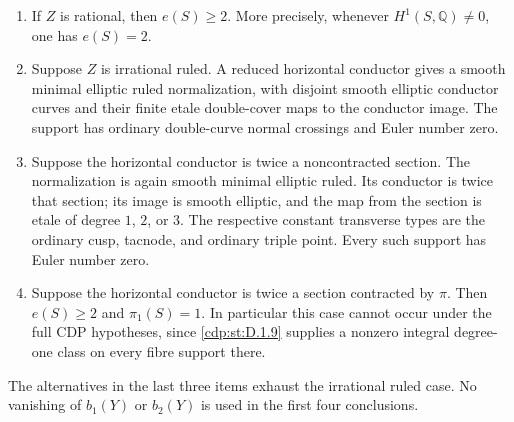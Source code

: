 \begin{proposition}
\begin{enumerate}
\item If $Z$ is rational, then $e(S)\ge2$. More precisely,
      whenever $H^1(S,\mathbb Q)\ne0$, one has $e(S)=2$.
\item Suppose $Z$ is irrational ruled. A reduced horizontal
      conductor gives a smooth minimal elliptic ruled
      normalization, with disjoint smooth elliptic conductor
      curves and their finite etale double-cover maps to the
      conductor image. The support has ordinary double-curve
      normal crossings and Euler number zero.
\item Suppose the horizontal conductor is twice a noncontracted
      section. The normalization is again smooth minimal
      elliptic ruled. Its conductor is twice that section;
      its image is smooth elliptic, and the map from the
      section is etale of degree $1$, $2$, or $3$.
      The respective constant transverse types are the
      ordinary cusp, tacnode, and ordinary triple point.
      Every such support has Euler number zero.
\item Suppose the horizontal conductor is twice a section
      contracted by $\pi$. Then $e(S)\ge2$ and
      $\pi_1(S)=1$. In particular this case cannot occur
      under the full CDP hypotheses, since \ref{cdp:st:D.1.9} supplies
      a nonzero integral degree-one class on every fibre
      support there.
\end{enumerate}
The alternatives in the last three items exhaust the
irrational ruled case. No vanishing of $b_1(Y)$ or $b_2(Y)$
is used in the first four conclusions.
\end{proposition}

